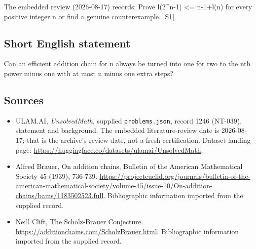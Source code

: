 \documentclass[11pt,a4paper]{article}
\newcommand{\sref}[2]{\hyperlink{source:#1:#2}{[S#2]}}
\begin{document}
The embedded review (2026-08-17) records: Prove l(2\textasciicircum{}n-1) <= n-1+l(n) for every positive integer n or find a genuine counterexample. \sref{1246}{1}

\subsection{Short English statement}

Can an efficient addition chain for n always be turned into one for two to the nth power minus one with at most n minus one extra steps?

\subsection{Sources}

{\small

\begin{itemize}

\item[\hypertarget{source:1246:1}{S1}] ULAM.AI, \emph{UnsolvedMath}, supplied \texttt{problems.json}, record 1246 (NT-039), statement and background. The embedded literature-review date is 2026-08-17; that is the archive’s review date, not a fresh certification. Dataset landing page: \url{https://huggingface.co/datasets/ulamai/UnsolvedMath}.

\item[\hypertarget{source:1246:2}{S2}] Alfred Brauer, On addition chains, Bulletin of the American Mathematical Society 45 (1939), 736-739. \url{https://projecteuclid.org/journals/bulletin-of-the-american-mathematical-society/volume-45/issue-10/On-addition-chains/bams/1183502523.full}. Bibliographic information imported from the supplied record.

\item[\hypertarget{source:1246:3}{S3}] Neill Clift, The Scholz-Brauer Conjecture. \url{https://additionchains.com/ScholzBrauer.html}. Bibliographic information imported from the supplied record.

\end{itemize}

}

\label{end:1246}
\end{document}
